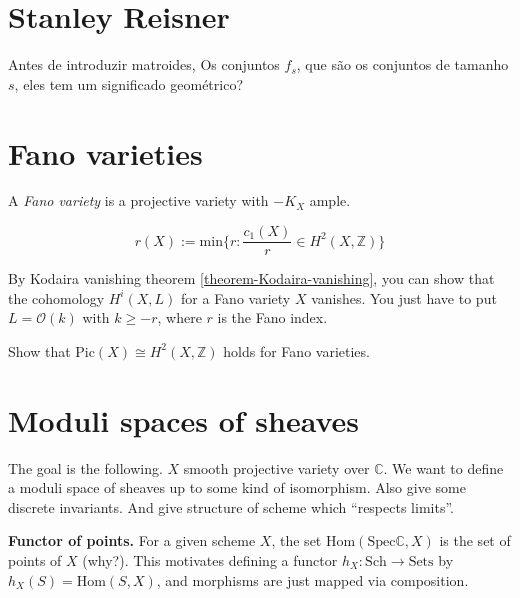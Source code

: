 \section{Stanley Reisner}
\label{section-}

Antes de introduzir matroides, Os conjuntos $f_s$, que são os conjuntos de
tamanho $s$, eles tem um significado geométrico?



\section{Fano varieties}
\label{section-Fano-varieties}

\begin{definition}
\label{definition-Fano-variety}
A {\it Fano variety} is a projective variety with $-K_X$ ample.
\end{definition}

\begin{definition}
\label{definition-Fano-index}
$$
r(X):=\text{min}\{r:\frac{c_1(X)}{r}\in H^{2}(X,\mathbb{Z})\}
$$
\end{definition}

\begin{exercise}
\label{exercise-Fano-vanishing-higher-cohomology}
By Kodaira vanishing theorem \ref{theorem-Kodaira-vanishing}, 
you can show that the cohomology $H^{i}(X,L)$ for
a Fano variety $X$ vanishes. You just have to put $L=\mathcal{O}(k)$ with $k\geq
-r$, where $r$ is the Fano index.
\end{exercise}

\begin{exercise}
\label{exercise-Pic-H2-Fano}
Show that  $\text{Pic}(X)\cong H^{2}(X,\mathbb{Z})$ holds for Fano varieties.
\end{exercise}

\section{Moduli spaces of sheaves}
\label{section-moduli-spaces-of-sheaves}

The goal is the following. $X$ smooth projective variety over $\mathbb{C}$. We
want to define a moduli space of sheaves up to some kind of isomorphism. Also
give some discrete invariants. And give structure of scheme which ``respects
limits''.

{\bf Functor of points.} For a given scheme $X$, the set
$\text{Hom}(\text{Spec}\mathbb{C},X)$ is the set of points of $X$ (why?). This motivates
defining a functor $h_X:\text{Sch}\to \text{Sets}$ by $h_X(S)=\text{Hom}(S,X)$,
and morphisms are just mapped via composition.

